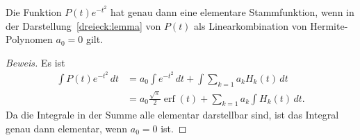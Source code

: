 \begin{satz}
\label{dreieck:satz1}
Die Funktion $P(t)e^{-t^2}$ hat genau dann eine elementare Stammfunktion,
wenn in der Darstellung~\eqref{dreieck:lemma}
von $P(t)$ als Linearkombination von Hermite-Polynomen $a_0=0$ gilt.
\end{satz}

\begin{proof}[Beweis]
Es ist
\begin{align*}
\int P(t)e^{-t^2}\,dt
&=
a_0\int e^{-t^2}\,dt
+
\int
\sum_{k=1} a_kH_k(t)\,dt
\\
&=
a_0
\frac{\sqrt{\pi}}2
\operatorname{erf}(t)
+
\sum_{k=1} a_k\int H_k(t)\,dt.
\end{align*}
Da die Integrale in der Summe alle elementar darstellbar sind,
ist das Integral genau dann elementar, wenn $a_0=0$ ist.
\end{proof}


